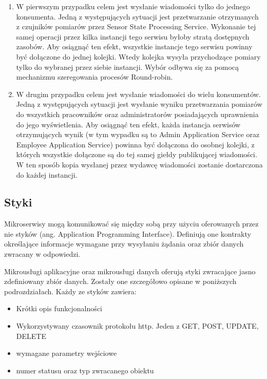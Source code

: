 \documentclass[11pt, a4]{article} %
\begin{document}
\begin{enumerate} %
    \item W pierwszym przypadku celem jest wysłanie wiadomości tylko do jednego konsumenta. Jedną
    z występujących sytuacji jest przetwarzanie otrzymanych z czujników pomiarów przez Sensor State
    Processing Service. Wykonanie tej samej operacji przez kilka instancji tego serwisu byłoby stratą
    dostępnych zasobów. Aby osiągnąć ten efekt, wszystkie instancje tego serwisu powinny być dołączone 
    do jednej kolejki. Wtedy kolejka wysyła przychodzące pomiary tylko do wybranej przez siebie instancji.
    Wybór odbywa się za pomocą mechanizmu szeregowania procesów Round-robin.
    \item W drugim przypadku celem jest wysłanie wiadomości do wielu konsumentów. Jedną z występujących
    sytuacji jest wysłanie wyniku przetwarzania pomiarów do wszystkich pracowników oraz administratorów
    posiadających uprawnienia do jego wyświetlenia. Aby osiągnąć ten efekt, każda instancja serwisów
    otrzymujących wynik (w tym wypadku są to Admin Application Service oraz Employee Application Service)
    powinna być dołączona do osobnej kolejki, z których wszystkie dołączone są do tej samej giełdy
    publikującej wiadomości. W ten sposób kopia wysłanej przez wydawcę wiadomości zostanie dostarczona
    do każdej instancji.
\end{enumerate}

\subsection{Styki}

Mikroserwisy mogą komunikować się między sobą przy użyciu oferowanych przez nie 
styków (ang. Application Programming Interface). Definiują one kontrakty 
określające informacje wymagane przy wysyłaniu żądania oraz zbiór danych zwracany 
w odpowiedzi.

Mikrousługi aplikacyjne oraz mikrousługi danych oferują styki zwracające jasno 
zdefiniowany zbiór danych. Zostały one szczegółowo opisane w poniższych podrozdziałach. 
Każdy ze styków zawiera:

\begin{itemize} %
    \item Krótki opis funkcjonalności
    \item Wykorzystywany czasownik protokołu http. Jeden z GET, POST, UPDATE, DELETE
    \item wymagane parametry wejściowe
    \item numer statusu oraz typ zwracanego obiektu
\end{itemize}
\end{document}
